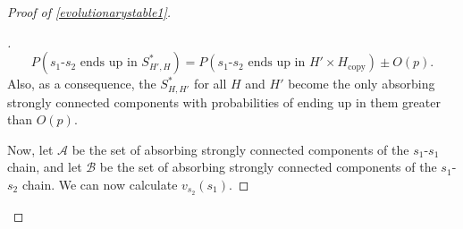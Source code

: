 \documentclass[11pt]{amsart}
\theoremstyle{definition}
\theoremstyle{remark}
\newenvironment{subproof}[1][\proofname]{%
  \renewcommand{\qedsymbol}{$\blacksquare$}%
  \begin{proof}[#1]%
}{%
  \end{proof}%
}
\begin{document}
\begin{proof}[Proof of \cref{evolutionarystable1}]
\begin{subproof}
        \begin{equation}
          \label{eqshh}
          P(\text{$s_1$-$s_2$ ends up in $S_{H',H}^*$}) = P(\text{$s_1$-$s_2$ ends up in $H' \times H_\text{copy}$})  \pm O(p).
        \end{equation}
        Also, as a consequence, the $S_{H,H'}^*$ for all $H$ and $H'$ become the only absorbing strongly connected components with probabilities of ending up in them greater than $O(p)$.

        Now, let $\mathcal{A}$ be the set of absorbing strongly connected components of the $s_1$-$s_1$ chain, and let $\mathcal{B}$ be the set of absorbing strongly connected components of the $s_1$-$s_2$ chain. We can now calculate $v_{s_2}(s_1)$.



\end{subproof}
\end{proof}
\end{document}
